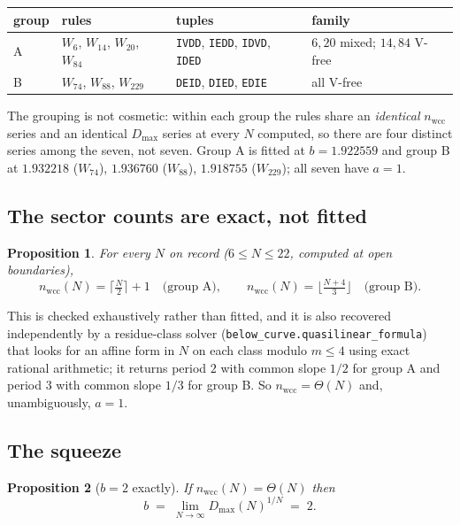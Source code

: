 \documentclass[11pt]{article}
\newcommand{\rt}[1]{\texttt{#1}}
\newcommand{\fn}[1]{\texttt{#1}}
\newcommand{\wcc}{\mathrm{wcc}}
\theoremstyle{plain}
\newtheorem{proposition}{Proposition}
\begin{document}
\begin{center}
\begin{tabular}{llll}
\toprule
group & rules & tuples & family \\
\midrule
A & $W_6$, $W_{14}$, $W_{20}$, $W_{84}$ & \rt{IVDD}, \rt{IEDD}, \rt{IDVD},
  \rt{IDED} & $6,20$ mixed; $14,84$ V-free \\
B & $W_{74}$, $W_{88}$, $W_{229}$ & \rt{DEID}, \rt{DIED}, \rt{EDIE} & all V-free \\
\bottomrule
\end{tabular}
\end{center}

\noindent The grouping is not cosmetic: within each group the rules share an
\emph{identical} $n_\wcc$ series and an identical $D_{\max}$ series at every $N$
computed, so there are four distinct series among the seven, not seven. Group A
is fitted at $b=1.922559$ and group B at $1.932218$ ($W_{74}$), $1.936760$
($W_{88}$), $1.918755$ ($W_{229}$); all seven have $a=1$.

\subsection{The sector counts are exact, not fitted}

\begin{proposition}
For every $N$ on record ($6\le N\le22$, computed at open boundaries),
\[
n_\wcc(N)=\Big\lceil \tfrac{N}{2}\Big\rceil+1 \quad\text{(group A)},
\qquad
n_\wcc(N)=\Big\lfloor \tfrac{N+4}{3}\Big\rfloor \quad\text{(group B)} .
\]
\end{proposition}

\noindent This is checked exhaustively rather than fitted, and it is also
recovered independently by a residue-class solver
(\fn{below\_curve.quasilinear\_formula}) that looks for an affine form in $N$ on
each class modulo $m\le4$ using exact rational arithmetic; it returns period $2$
with common slope $1/2$ for group A and period $3$ with common slope $1/3$ for
group B. So $n_\wcc=\Theta(N)$ and, unambiguously, $a=1$.

\subsection{The squeeze}

\begin{proposition}[$b=2$ exactly]
If $n_\wcc(N)=\Theta(N)$ then
\[
b \;=\; \lim_{N\to\infty} D_{\max}(N)^{1/N} \;=\; 2 .
\]
\end{proposition}
\end{document}
